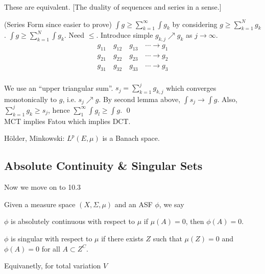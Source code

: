 These are equivalent. [The duality of sequences and series in a sense.]

\pf (Series Form since easier to prove) $\int g \geq \sum_{k=1}^\infty \int g_k$ by considering $g \geq \sum_{k=1}^N g_k$. $\int g \geq \sum_{k=1}^N \int g_k$. Need $\leq$. Introduce simple $g_{k,j} \nearrow g_k$ as $j \to \infty$.
	\[
	\begin{split}
	g_{11} \quad g_{12} \quad g_{13} \quad \cdots \to g_1 \\
	g_{21} \quad g_{22} \quad g_{23} \quad \cdots \to g_2 \\
	g_{31} \quad g_{32} \quad g_{33} \quad \cdots \to g_3 \\
	\end{split}
	\]

We use an ``upper triangular sum''. $s_j = \sum_{k=1}^j g_{k,j}$ which converges monotonically to $g$, i.e. $s_j \nearrow g$. By second lemma above, $\int s_j \to \int g$. Also, $\sum_{k=1}^j g_k \geq s_j$, hence $\sum_1^\infty \int g_l \geq \int g$. \qed \\



MCT implies Fatou which implies DCT.

H\"older, Minkowski: $L^p(E,\mu)$ is a Banach space. 






\subsection{Absolute Continuity \& Singular Sets}
Now we move on to 10.3 


Given a measure space $(X, \Sigma, \mu)$ and an ASF $\phi$, we say

\begin{dfn}
$\phi$ is absolutely continuous with respect to $\mu$ if $\mu(A)=0$, then $\phi(A)=0$. 
\end{dfn}


\begin{dfn}[Singular]
$\phi$ is singular with respect to $\mu$ if there exists $Z$ such that $\mu(Z)=0$ and $\phi(A)= 0$ for all $A \subset Z^C$. 
\end{dfn}


Equivanetly, for total variation $V$

